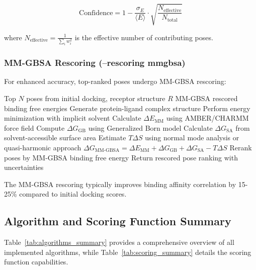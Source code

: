 \documentclass[11pt,a4paper]{article}
\begin{document}
\begin{equation}
\text{Confidence} = 1 - \frac{\sigma_E}{\langle E \rangle} \cdot \sqrt{\frac{N_{\text{effective}}}{N_{\text{total}}}}
\end{equation}

where $N_{\text{effective}} = \frac{1}{\sum_i w_i^2}$ is the effective number of contributing poses.

\subsubsection{MM-GBSA Rescoring (--rescoring mmgbsa)}

For enhanced accuracy, top-ranked poses undergo MM-GBSA rescoring:

\begin{algorithm}[H]
\caption{MM-GBSA Rescoring Protocol}
\begin{algorithmic}[1]
\Require Top $N$ poses from initial docking, receptor structure $R$
\Ensure MM-GBSA rescored binding free energies
    \State Generate protein-ligand complex structure
    \State Perform energy minimization with implicit solvent
    \State Calculate $\Delta E_{\text{MM}}$ using AMBER/CHARMM force field
    \State Compute $\Delta G_{\text{GB}}$ using Generalized Born model
    \State Calculate $\Delta G_{\text{SA}}$ from solvent-accessible surface area
    \State Estimate $T\Delta S$ using normal mode analysis or quasi-harmonic approach
    \State $\Delta G_{\text{MM-GBSA}} = \Delta E_{\text{MM}} + \Delta G_{\text{GB}} + \Delta G_{\text{SA}} - T\Delta S$
\EndFor
\State Rerank poses by MM-GBSA binding free energy
\State Return rescored pose ranking with uncertainties
\end{algorithmic}
\end{algorithm}

The MM-GBSA rescoring typically improves binding affinity correlation by 15-25\% compared to initial docking scores.

\subsection{Algorithm and Scoring Function Summary}

Table~\ref{tab:algorithms_summary} provides a comprehensive overview of all implemented algorithms, while Table~\ref{tab:scoring_summary} details the scoring function capabilities.
\end{document}
